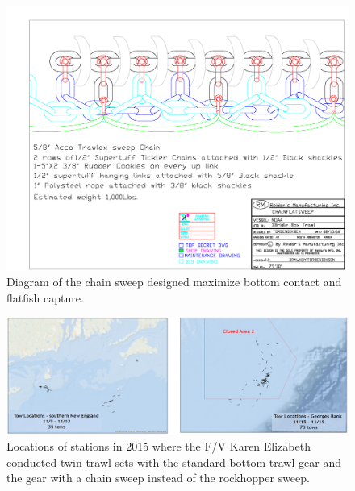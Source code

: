 \documentclass[12pt,letterpaper, leqno]{article}
\begin{document}
\begin{figure}
\caption{Diagram of the chain sweep designed maximize bottom contact and flatfish capture.}\label{chainsweep_schematic}
\begin{center}
\includegraphics[width = \textwidth]{chainsweep_schematic.pdf}
\end{center}
\end{figure}
\clearpage

\begin{figure}
\caption{Locations of stations in 2015 where the F/V Karen Elizabeth conducted twin-trawl sets with the standard bottom trawl gear and the gear with a chain sweep instead of the rockhopper sweep.}\label{2015_tow_locations}
\begin{center}
\includegraphics[width = \textwidth]{2015_tow_locations.png}
\end{center}
\end{figure}
\end{document}
